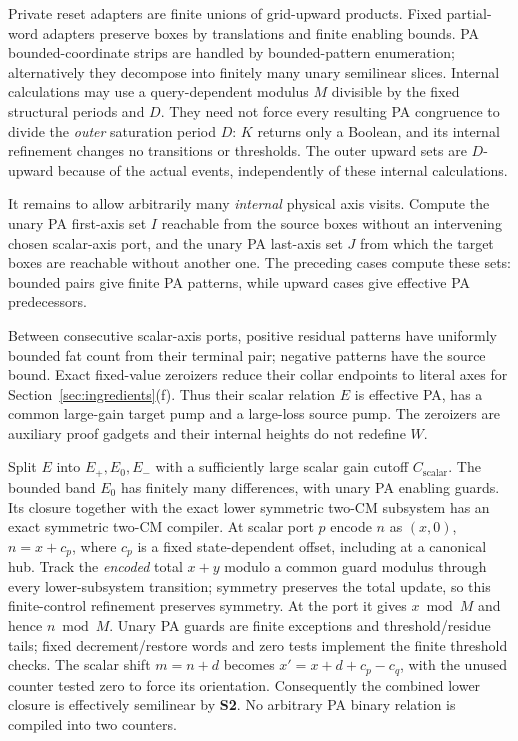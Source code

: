 \documentclass[11pt,a4paper]{article}
\theoremstyle{remark}
\newcommand{\Cs}{C_{\mathrm{scalar}}}
\begin{document}
Private reset adapters are finite unions of grid-upward products. Fixed partial-word adapters preserve boxes by translations and finite enabling bounds. PA bounded-coordinate strips are handled by bounded-pattern enumeration; alternatively they decompose into finitely many unary semilinear slices. Internal calculations may use a query-dependent modulus \(M\) divisible by the fixed structural periods and \(D\). They need not force every resulting PA congruence to divide the \emph{outer} saturation period \(D\): \(K\) returns only a Boolean, and its internal refinement changes no transitions or thresholds. The outer upward sets are \(D\)-upward because of the actual events, independently of these internal calculations.

It remains to allow arbitrarily many \emph{internal} physical axis visits. Compute the unary PA first-axis set \(I\) reachable from the source boxes without an intervening chosen scalar-axis port, and the unary PA last-axis set \(J\) from which the target boxes are reachable without another one. The preceding cases compute these sets: bounded pairs give finite PA patterns, while upward cases give effective PA predecessors.

Between consecutive scalar-axis ports, positive residual patterns have uniformly bounded fat count from their terminal pair; negative patterns have the source bound. Exact fixed-value zeroizers reduce their collar endpoints to literal axes for Section~\ref{sec:ingredients}(f). Thus their scalar relation \(E\) is effective PA, has a common large-gain target pump and a large-loss source pump. The zeroizers are auxiliary proof gadgets and their internal heights do not redefine \(W\).

Split \(E\) into \(E_+,E_0,E_-\) with a sufficiently large scalar gain cutoff \(\Cs\). The bounded band \(E_0\) has finitely many differences, with unary PA enabling guards. Its closure together with the exact lower symmetric two-CM subsystem has an exact symmetric two-CM compiler. At scalar port \(p\) encode \(n\) as \((x,0)\), \(n=x+c_p\), where \(c_p\) is a fixed state-dependent offset, including at a canonical hub. Track the \emph{encoded} total \(x+y\) modulo a common guard modulus through every lower-subsystem transition; symmetry preserves the total update, so this finite-control refinement preserves symmetry. At the port it gives \(x\bmod M\) and hence \(n\bmod M\). Unary PA guards are finite exceptions and threshold/residue tails; fixed decrement/restore words and zero tests implement the finite threshold checks. The scalar shift \(m=n+d\) becomes \(x'=x+d+c_p-c_q\), with the unused counter tested zero to force its orientation. Consequently the combined lower closure is effectively semilinear by \textbf{S2}. No arbitrary PA binary relation is compiled into two counters.
\end{document}
